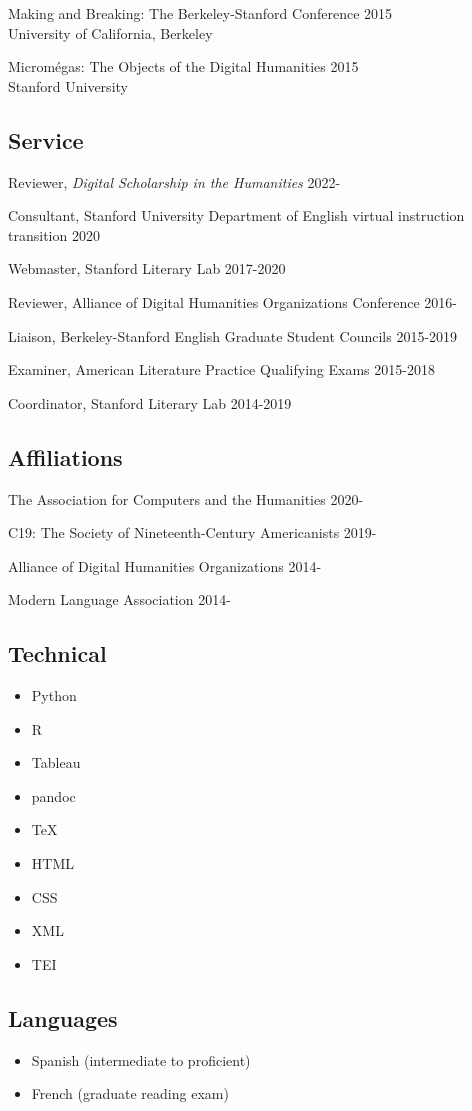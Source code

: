 \documentclass[
  12pt,
  letterpaper,
]{article}
\providecommand{\tightlist}{%
  \setlength{\itemsep}{0pt}\setlength{\parskip}{0pt}}
\begin{document}
Making and Breaking: The Berkeley-Stanford Conference \hfill 2015\\
\hspace*{0.333em} University of California, Berkeley

Micromégas: The Objects of the Digital Humanities \hfill 2015\\
\hspace*{0.333em} Stanford University

\hypertarget{service}{%
\subsection{Service}\label{service}}

Reviewer, \emph{Digital Scholarship in the Humanities} \hfill 2022-

Consultant, Stanford University Department of English virtual
instruction transition \hfill 2020

Webmaster, Stanford Literary Lab \hfill 2017-2020

Reviewer, Alliance of Digital Humanities Organizations Conference
\hfill 2016-

Liaison, Berkeley-Stanford English Graduate Student Councils
\hfill 2015-2019

Examiner, American Literature Practice Qualifying Exams \hfill 2015-2018

Coordinator, Stanford Literary Lab \hfill 2014-2019

\hypertarget{affiliations}{%
\subsection{Affiliations}\label{affiliations}}

The Association for Computers and the Humanities \hfill 2020-

C19: The Society of Nineteenth-Century Americanists \hfill 2019-

Alliance of Digital Humanities Organizations \hfill 2014-

Modern Language Association \hfill 2014-

\hypertarget{technical}{%
\subsection{Technical}\label{technical}}

\begin{itemize}
\tightlist
\item
  Python
\item
  R
\item
  Tableau
\item
  pandoc
\item
  TeX
\item
  HTML
\item
  CSS
\item
  XML
\item
  TEI
\end{itemize}

\hypertarget{languages}{%
\subsection{Languages}\label{languages}}

\begin{itemize}
\tightlist
\item
Spanish (intermediate to proficient)
\item
French (graduate reading exam)
\end{itemize}
\end{document}
